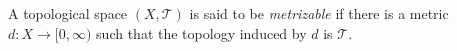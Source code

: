 \documentclass[12pt]{article}
\begin{document}
A topological space $(X,\mathcal{T})$ is said to be \emph{metrizable} if there is a metric $d\colon X\to [0,\infty)$ such that the topology induced by $d$ is $\mathcal{T}$.
\end{document}
